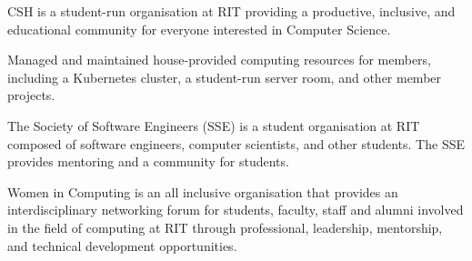 \medskip


\medskip


\smallskip
\smallskip


\medskip
{}

CSH is a student-run organisation at RIT providing a productive, inclusive, and educational community for everyone interested in Computer Science.

\smallskip

Managed and maintained house-provided computing resources for members, including a Kubernetes cluster, a student-run server room, and other member projects.

\divider

The Society of Software Engineers (SSE) is a student organisation at RIT composed of software engineers, computer scientists, and other students. The SSE provides mentoring and a community for students.

\divider

Women in Computing is an all inclusive organisation that provides an interdisciplinary networking forum for students, faculty, staff and alumni involved in the field of computing at RIT through professional, leadership, mentorship, and technical development opportunities.
